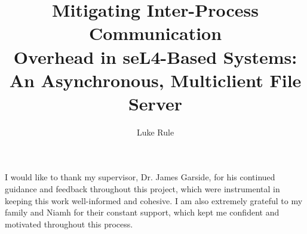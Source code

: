 \documentclass[12pt,BSc,wordcount,twoside]{muthesis}
\begin{document}
  
\tablespagefalse

\title{Mitigating Inter-Process Communication \\ Overhead in seL4-Based Systems: \\ An Asynchronous, Multiclient File Server}
\author{Luke Rule}

\beforeabstract


\newpage
\afterabstract

I would like to thank my supervisor, Dr. James Garside, for his continued guidance and feedback throughout this project, which were instrumental in keeping this work well-informed and cohesive. I am also extremely grateful to my family and Niamh for their constant support, which kept me confident and motivated throughout this process.


\afterpreface







 

\begingroup
\sloppy
\raggedright
\printbibliography
\endgroup
\end{document}

